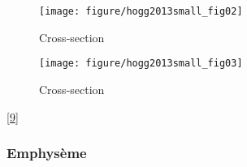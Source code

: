 \documentclass[12pt,]{article}
\begin{document}
\begin{figure}[h!]

{\centering \texttt{[image: figure/hogg2013small\_fig02]} 

}

\caption{Cross-section}\label{fig:unnamed-chunk-3}
\end{figure}

\begin{figure}[h!]

{\centering \texttt{[image: figure/hogg2013small\_fig03]} 

}

\caption{Cross-section}\label{fig:unnamed-chunk-4}
\end{figure}

{[}\protect\hyperlink{ref-reid1958secondary}{9}{]}

\hypertarget{emphyseme}{%
\subsubsection{Emphysème}\label{emphyseme}}
\end{document}
